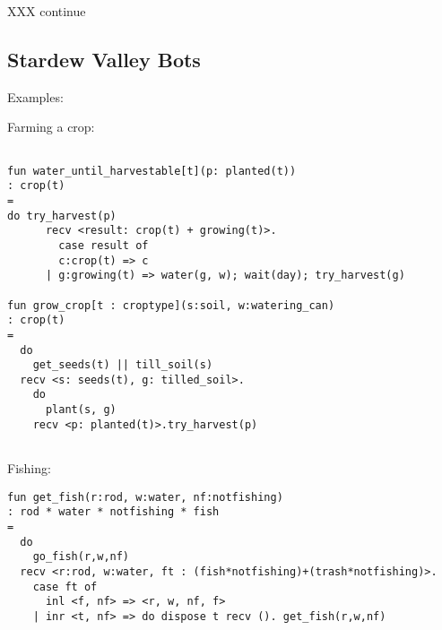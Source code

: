 XXX continue

\subsection{Stardew Valley Bots}

Examples:

Farming a crop:
\begin{verbatim}

fun water_until_harvestable[t](p: planted(t))
: crop(t)
=
do try_harvest(p)
      recv <result: crop(t) + growing(t)>.
        case result of
        c:crop(t) => c
      | g:growing(t) => water(g, w); wait(day); try_harvest(g)

fun grow_crop[t : croptype](s:soil, w:watering_can)
: crop(t)
=
  do
    get_seeds(t) || till_soil(s)
  recv <s: seeds(t), g: tilled_soil>.
    do
      plant(s, g)
    recv <p: planted(t)>.try_harvest(p)
        
\end{verbatim}

Fishing:
\begin{verbatim}
fun get_fish(r:rod, w:water, nf:notfishing) 
: rod * water * notfishing * fish
=
  do  
    go_fish(r,w,nf)
  recv <r:rod, w:water, ft : (fish*notfishing)+(trash*notfishing)>.
    case ft of
      inl <f, nf> => <r, w, nf, f>
    | inr <t, nf> => do dispose t recv (). get_fish(r,w,nf)
\end{verbatim}


